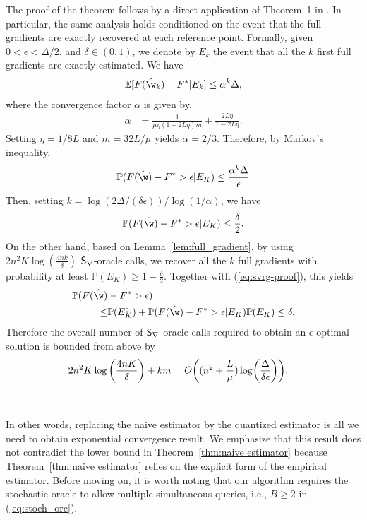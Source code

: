 \documentclass{article}
\theoremstyle{definition}  \newtheorem{exercise}{Exercise}
\theoremstyle{plain}
\newcommand{\EE}{\mathbb{E}}
\newcommand{\PP}{\mathbb{P}}
\renewenvironment{proof}{\par\noindent{\bf Proof\ }}{\hfill\BlackBox\\[2mm]}
\newcommand{\BlackBox}{\rule{1.5ex}{1.5ex}}
\DeclarePairedDelimiter{\prn}{(}{)}
\newcommand{\strcvx}{\mu} \newcommand{\query}{B}
\theoremstyle{definition}
\theoremstyle{remark}
\begin{document}
	\begin{proof}
	The proof of the theorem follows by a direct application of	
	Theorem~1 in \cite{johnson2013accelerating}. In 
	particular, the same analysis 
	holds conditioned on the event that the full gradients are exactly 
	recovered at each reference point. Formally, given $0<\epsilon<\Delta/2$, and 
	$\delta\in(0,1)$, 
we denote by $E_k$ the event that 
	all the $k$ first full gradients are exactly estimated. We have
	\begin{align*}
	\EE[F(\hat{\w}_k)-F^* | E_k] \le \alpha^k \Delta,
	\end{align*}
	where the convergence factor $\alpha$ is given by,
	\begin{align*}
	\alpha & = \frac{1}{\strcvx \eta (1-2L\eta )m}+ \frac{2L\eta}{1- 2L\eta}.
	\end{align*}
    Setting $\eta= 1/8L$ and $m=32L/\strcvx$ yields $\alpha = 2/3$. Therefore, by Markov's inequality, 
    \[ \PP(F(\hat{\w})-F^*> \epsilon | E_K) \le \frac{\alpha^k \Delta}{\epsilon} \]
    Then, setting $k =\log(2\Delta/(\delta\epsilon))/\log (1/\alpha)$, we have 
    \begin{equation}\label{eq:svrg-proof}
        \PP(F(\hat{\w})-F^*> \epsilon | E_K) \le \frac{\delta}{2}.
    \end{equation} 
    On the other hand, based on Lemma~{\ref{lem:full_gradient}}, by using $2n^2K\log\left(\frac{4nk}{\delta}\right)$ $\mathsf{S}_{\nabla}$-oracle calls, we recover all the $k$ full gradients with probability at least $ \PP(E_K ) \ge 1- \frac{\delta}{2}$.
    Together with (\ref{eq:svrg-proof}), this yields
    \begin{align*}
         \PP(F(\hat{\w})&-F^*> \epsilon) \\
     \le & \PP(E_K^c) + \PP(F(\hat{\w})-F^*> \epsilon | E_K)  \PP(E_K) \le 
     \delta. 
    \end{align*} 
    Therefore the overall number of $\mathsf{S}_{\nabla}$-oracle calls required to obtain an
    $\epsilon$-optimal solution is bounded from above by 
    \begin{align*}
        & 2n^2K\log\left(\frac{4nK}{\delta}\right)+km 
     =   \tilde{O} \prn*{(n^2+\frac{L}{\mu}) \log \prn*{\frac{\Delta}{\delta \epsilon}} }. 
    \end{align*}
\end{proof}        
    In other words, replacing the naive estimator by the quantized estimator is all we need to obtain exponential convergence result. We emphasize that this result does not contradict the lower bound in Theorem~\ref{thm:naive estimator} because Theorem~\ref{thm:naive estimator} relies on the explicit form of the empirical estimator. Before moving on, it is worth noting that our algorithm requires the stochastic oracle to 
    allow multiple simultaneous queries, i.e., $\query \ge 2$ in 
    (\ref{eq:stoch_orc}). 
\end{document}
